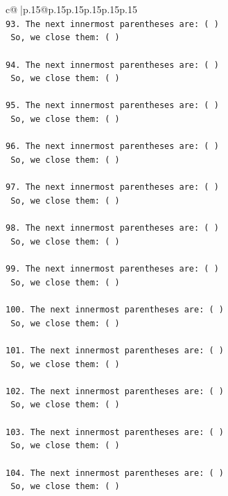 \documentclass{article}
\begin{document}
{\begin{supertabular}{c@{$\;$}|p{.15\linewidth}@{}p{.15\linewidth}p{.15\linewidth}p{.15\linewidth}p{.15\linewidth}p{.15\linewidth}}
{{{\\ 
\texttt{93. The next innermost parentheses are: ( ) } \\
\texttt{    So, we close them: ( ) } \\
\\ 
\texttt{94. The next innermost parentheses are: ( ) } \\
\texttt{    So, we close them: ( ) } \\
\\ 
\texttt{95. The next innermost parentheses are: ( ) } \\
\texttt{    So, we close them: ( ) } \\
\\ 
\texttt{96. The next innermost parentheses are: ( ) } \\
\texttt{    So, we close them: ( ) } \\
\\ 
\texttt{97. The next innermost parentheses are: ( ) } \\
\texttt{    So, we close them: ( ) } \\
\\ 
\texttt{98. The next innermost parentheses are: ( ) } \\
\texttt{    So, we close them: ( ) } \\
\\ 
\texttt{99. The next innermost parentheses are: ( ) } \\
\texttt{    So, we close them: ( ) } \\
\\ 
\texttt{100. The next innermost parentheses are: ( ) } \\
\texttt{    So, we close them: ( ) } \\
\\ 
\texttt{101. The next innermost parentheses are: ( ) } \\
\texttt{    So, we close them: ( ) } \\
\\ 
\texttt{102. The next innermost parentheses are: ( ) } \\
\texttt{    So, we close them: ( ) } \\
\\ 
\texttt{103. The next innermost parentheses are: ( ) } \\
\texttt{    So, we close them: ( ) } \\
\\ 
\texttt{104. The next innermost parentheses are: ( ) } \\
\texttt{    So, we close them: ( ) } \\
}}}
\end{supertabular}}
\end{document}
